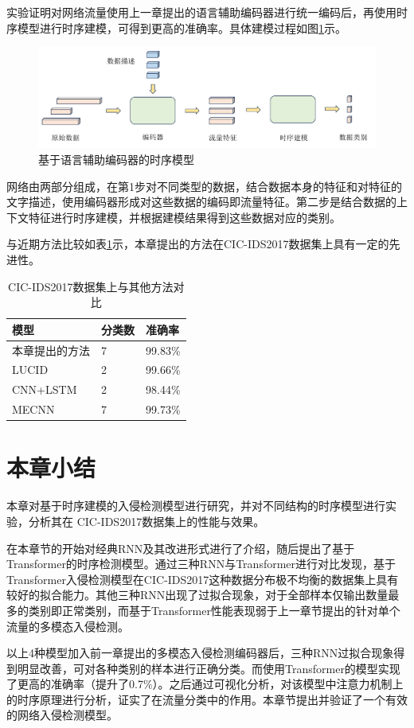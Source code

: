 实验证明对网络流量使用上一章提出的语言辅助编码器进行统一编码后，再使用时序模型进行时序建模，可得到更高的准确率。具体建模过程如图\ref{fig:overview}示。
\begin{figure}[htb]
    \centering
    \includegraphics[width=\textwidth,height=\textheight,keepaspectratio]{img/overview.pdf}
    \caption{基于语言辅助编码器的时序模型}
    \label{fig:overview}
\end{figure}
网络由两部分组成，在第1步对不同类型的数据，结合数据本身的特征和对特征的文字描述，使用编码器形成对这些数据的编码即流量特征。第二步是结合数据的上下文特征进行时序建模，并根据建模结果得到这些数据对应的类别。

与近期方法比较如表\ref{tab:trm_cic2017_compare}示，本章提出的方法在CIC-IDS2017数据集上具有一定的先进性。

\begin{table}[htb]
    \centering
    \caption{CIC-IDS2017数据集上与其他方法对比}
    \begin{tabular}{lll}
    \toprule
        模型 & 分类数 & 准确率 \\ \midrule
        本章提出的方法 & 7 & 99.83\% \\ 
        LUCID\cite{10.1109/TNSM.2020.2971776}& 2 & 99.66\% \\ 
        CNN+LSTM\cite{10.1109/CCWC.2019.8666588}& 2 & 98.44\% \\
        MECNN\cite{10.1016/j.knosys.2022.108505}& 7& 99.73\%\\ 
        \bottomrule
    \end{tabular}
    \label{tab:trm_cic2017_compare}
\end{table}

\section{本章小结}
本章对基于时序建模的入侵检测模型进行研究，并对不同结构的时序模型进行实验，分析其在 CIC-IDS2017数据集上的性能与效果。

在本章节的开始对经典RNN及其改进形式进行了介绍，随后提出了基于Transformer的时序检测模型。通过三种RNN与Transformer进行对比发现，基于Transformer入侵检测模型在CIC-IDS2017这种数据分布极不均衡的数据集上具有较好的拟合能力。其他三种RNN出现了过拟合现象，对于全部样本仅输出数量最多的类别即正常类别，而基于Transformer性能表现弱于上一章节提出的针对单个流量的多模态入侵检测。

以上4种模型加入前一章提出的多模态入侵检测编码器后，三种RNN过拟合现象得到明显改善，可对各种类别的样本进行正确分类。而使用Transformer的模型实现了更高的准确率（提升了0.7\%）。之后通过可视化分析，对该模型中注意力机制上的时序原理进行分析，证实了在流量分类中的作用。本章节提出并验证了一个有效的网络入侵检测模型。
